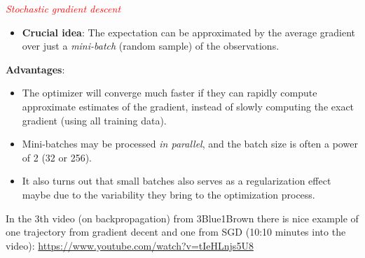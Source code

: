 \documentclass[10pt,ignorenonframetext,]{beamer}
\providecommand{\tightlist}{%
  \setlength{\itemsep}{0pt}\setlength{\parskip}{0pt}}
\begin{document}
\begin{frame}

\emph{\textcolor{red}{Stochastic gradient descent}}

\begin{itemize}
\tightlist
\item
  \textbf{Crucial idea}: The expectation can be approximated by the
  average gradient over just a \emph{mini-batch} (random sample) of the
  observations.
\end{itemize}

\vspace{2mm}

\textbf{Advantages}:

\begin{itemize}
\item
  The optimizer will converge much faster if they can rapidly compute
  approximate estimates of the gradient, instead of slowly computing the
  exact gradient (using all training data).
\item
  Mini-batches may be processed \emph{in parallel}, and the batch size
  is often a power of 2 (32 or 256).
\item
  It also turns out that small batches also serves as a regularization
  effect maybe due to the variability they bring to the optimization
  process.
\end{itemize}

\end{frame}

\begin{frame}

In the 3th video (on backpropagation) from 3Blue1Brown there is nice
example of one trajectory from gradient decent and one from SGD (10:10
minutes into the video):
\url{https://www.youtube.com/watch?v=tIeHLnjs5U8}

\end{frame}
\end{document}
